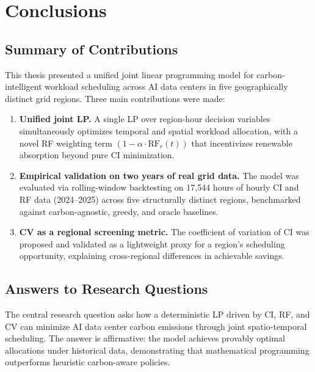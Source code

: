 \section{Conclusions}
\label{sec:conclusion}


\subsection{Summary of Contributions}

This thesis presented a unified joint linear programming model for carbon-intelligent workload scheduling across AI data centers in five geographically distinct grid regions.
Three main contributions were made:

\begin{enumerate}[leftmargin=1.5em]
  \item \textbf{Unified joint LP.}
        A single LP over region-hour decision variables simultaneously optimizes temporal and spatial workload allocation, with a novel RF weighting term $(1-\alpha\cdot\mathrm{RF}_r(t))$ that incentivizes renewable absorption beyond pure CI minimization.

  \item \textbf{Empirical validation on two years of real grid data.}
        The model was evaluated via rolling-window backtesting on 17,544 hours of hourly CI and RF data (2024--2025) across five structurally distinct regions, benchmarked against carbon-agnostic, greedy, and oracle baselines.

  \item \textbf{CV as a regional screening metric.}
        The coefficient of variation of CI was proposed and validated as a lightweight proxy for a region's scheduling opportunity, explaining cross-regional differences in achievable savings.
\end{enumerate}


\subsection{Answers to Research Questions}

The central research question asks how a deterministic LP driven by CI, RF, and CV can minimize AI data center carbon emissions through joint spatio-temporal scheduling. The answer is affirmative: the model achieves provably optimal allocations under historical data, demonstrating that mathematical programming outperforms heuristic carbon-aware policies.

